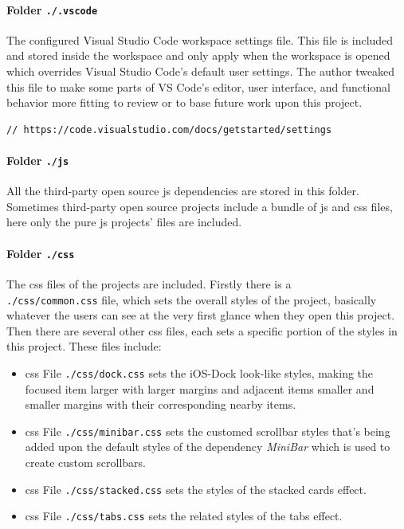 \paragraph{Folder \texttt{./.vscode}}

The configured Visual Studio Code workspace settings file. This file is included and stored inside the workspace and only apply when the workspace is opened which overrides Visual Studio Code's default user settings. The author tweaked this file to make some parts of VS Code's editor, user interface, and functional behavior more fitting to review or to base future work upon this project.

\begin{verbatim}
// https://code.visualstudio.com/docs/getstarted/settings
\end{verbatim}

\paragraph{Folder \texttt{./js}}

All the third-party open source \gls{js} dependencies are stored in this folder. Sometimes third-party open source projects include a bundle of \glsdesc{js} and \gls{css} files, here only the pure \gls{js} projects' files are included.

\paragraph{Folder \texttt{./css}}

The \gls{css} files of the projects are included. Firstly there is a \\\texttt{./css/common.css} file, which sets the overall styles of the project, basically whatever the users can see at the very first glance when they open this project. Then there are several other \gls{css} files, each sets a specific portion of the styles in this project. These files include:

\begin{itemize}
\item \gls{css} File \texttt{./css/dock.css} sets the iOS-Dock look-like styles, making the focused item larger with larger margins and adjacent items smaller and smaller margins with their corresponding nearby items.
\item \gls{css} File \texttt{./css/minibar.css} sets the customed scrollbar styles that's being added upon the default styles of the dependency \emph{MiniBar} which is used to create custom scrollbars.
\item \gls{css} File \texttt{./css/stacked.css} sets the styles of the stacked cards effect.
\item \gls{css} File \texttt{./css/tabs.css} sets the related styles of the tabs effect.
\end{itemize}

